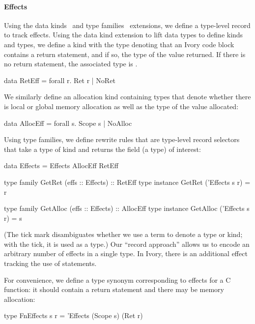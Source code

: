 \paragraph{Effects}
Using the data kinds~\cite{} and type families~\cite{} extensions, we define a
type-level record to track effects.  Using the data kind extension to lift data
types to define kinds and types, we define a kind  with the type
 denoting that an Ivory code block contains a return statement, and if
so, the type of the value returned.  If there is no return statement, the
associated type is .
\begin{code}
data RetEff   = forall r. Ret r | NoRet
\end{code}
\noindent
We similarly define an allocation kind containing types that denote whether
there is local or global memory allocation as well as the type of the value
allocated:
\begin{code}
data AllocEff = forall s. Scope s | NoAlloc
\end{code}
\noindent
Using type families, we define rewrite rules that are type-level record
selectors that take a type of kind  and returns the field (a type)
of interest:
\begin{code}
data Effects  = Effects AllocEff RetEff

type family   GetRet (effs :: Effects) :: RetEff
type instance GetRet ('Effects s r) = r

type family   GetAlloc (effs :: Effects) :: AllocEff
type instance GetAlloc ('Effects s r) = s
\end{code}
\noindent
(The tick mark disambiguates whether we use a term to denote a type or kind;
with the tick, it is used as a type.)  Our ``record approach'' allows us to
encode an arbitrary number of effects in a single type.  In Ivory, there is an
additional effect tracking the use of  statements.

For convenience, we define a type synonym corresponding to effects for a C
function: it should contain a return statement and there may be memory
allocation:
\begin{code}
type FnEffects s r = 'Effects (Scope s) (Ret r)
\end{code}

